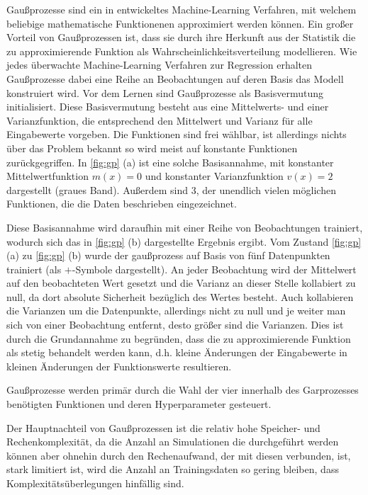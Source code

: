 Gaußprozesse sind ein in \cite{Rasmussen.2008} entwickeltes Machine-Learning Verfahren, mit welchem beliebige mathematische Funktionenen approximiert werden können.
Ein großer Vorteil von Gaußprozessen ist, dass sie durch ihre Herkunft aus der Statistik die zu approximierende Funktion als Wahrscheinlichkeitsverteilung modellieren.
Wie jedes überwachte Machine-Learning Verfahren zur Regression erhalten Gaußprozesse dabei eine Reihe an Beobachtungen auf deren Basis das Modell konstruiert wird.
Vor dem Lernen sind Gaußprozesse als Basisvermutung initialisiert.
Diese Basisvermutung besteht aus eine Mittelwerts- und einer Varianzfunktion, die entsprechend den Mittelwert und Varianz für alle Eingabewerte vorgeben.
Die Funktionen sind frei wählbar, ist allerdings nichts über das Problem bekannt so wird meist auf konstante Funktionen zurückgegriffen.
In \cref{fig:gp} (a) ist eine solche Basisannahme, mit konstanter Mittelwertfunktion $m(x)=0$ und konstanter Varianzfunktion $v(x)=2$ dargestellt (graues Band).
Außerdem sind 3, der unendlich vielen möglichen Funktionen, die die Daten beschrieben eingezeichnet.

Diese Basisannahme wird daraufhin mit einer Reihe von Beobachtungen trainiert, wodurch sich das in \cref{fig:gp} (b) dargestellte Ergebnis ergibt.
Vom Zustand \cref{fig:gp} (a) zu \cref{fig:gp} (b) wurde der gaußprozess auf Basis von fünf Datenpunkten trainiert (als $+$-Symbole dargestellt).
An jeder Beobachtung wird der Mittelwert auf den beobachteten Wert gesetzt und die Varianz an dieser Stelle kollabiert zu null, da dort absolute Sicherheit bezüglich des Wertes besteht.
Auch kollabieren die Varianzen um die Datenpunkte, allerdings nicht zu null und je weiter man sich von einer Beobachtung entfernt, desto größer sind die Varianzen.
Dies ist durch die Grundannahme zu begründen, dass die zu approximierende Funktion als stetig behandelt werden kann, d.h. kleine Änderungen der Eingabewerte in kleinen Änderungen der Funktionswerte resultieren.

Gaußprozesse werden primär durch die Wahl der vier innerhalb des Garprozesses benötigten Funktionen und deren Hyperparameter gesteuert.


Der Hauptnachteil von Gaußprozessen ist die relativ hohe Speicher- und Rechenkomplexität, da die Anzahl an Simulationen die durchgeführt werden können aber ohnehin durch den Rechenaufwand, der mit diesen verbunden, ist, stark limitiert ist, wird die Anzahl an Trainingsdaten so gering bleiben, dass Komplexitätsüberlegungen hinfällig sind.

